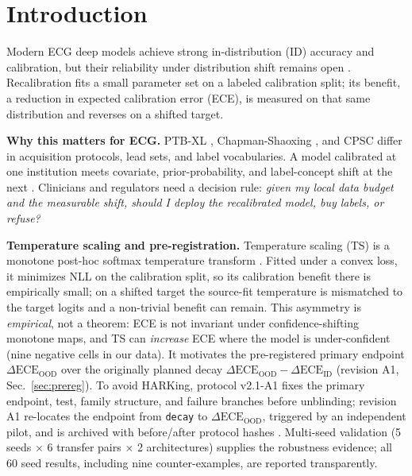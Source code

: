 \documentclass[review,12pt,nonatbib]{elsarticle}
\begin{document}


\section{Introduction}
\label{sec:intro}
Modern ECG deep models achieve strong in-distribution (ID) accuracy and
calibration, but their reliability under distribution shift remains open
\cite{ovadia2019calibration,guo2017calibration,wagner2020ptbxl}.
Recalibration fits a small parameter set on a labeled calibration split;
its benefit, a reduction in expected calibration error (ECE), is measured
on that same distribution and reverses on a shifted target.

\textbf{Why this matters for ECG.} PTB-XL \cite{wagner2020ptbxl},
Chapman-Shaoxing \cite{zheng2022ecgarrhythmia}, and CPSC differ in
acquisition protocols, lead sets, and label vocabularies. A model
calibrated at one institution meets covariate, prior-probability, and
label-concept shift at the next \cite{morenotorres2012}. Clinicians and
regulators need a decision rule: \emph{given my local data budget and the
measurable shift, should I deploy the recalibrated model, buy labels, or
refuse?}

\textbf{Temperature scaling and pre-registration.}
Temperature scaling (TS) is a monotone post-hoc softmax temperature
transform \cite{guo2017calibration}. Fitted under a convex loss, it
minimizes NLL on the calibration split, so its calibration benefit there
is empirically small; on a shifted target the source-fit temperature is
mismatched to the target logits and a non-trivial benefit can remain.
This asymmetry is \emph{empirical}, not a theorem: ECE is not invariant
under confidence-shifting monotone maps, and TS can \emph{increase} ECE
where the model is under-confident (nine negative cells in our data). It
motivates the pre-registered primary endpoint
$\Delta\text{ECE}_{\text{OOD}}$ over the originally planned decay
$\Delta\text{ECE}_{\text{OOD}}-\Delta\text{ECE}_{\text{ID}}$ (revision A1,
Sec.~\ref{sec:prereg}). To avoid HARKing, protocol v2.1-A1
\cite{protocolv21a1} fixes the primary endpoint, test, family structure,
and failure branches before unblinding; revision A1 re-locates the
endpoint from \texttt{decay} to $\Delta\text{ECE}_{\text{OOD}}$, triggered
by an independent pilot, and is archived with before/after protocol hashes
\cite{nosek2019prereg,lakens2019prereg}. Multi-seed validation
(5 seeds $\times$ 6 transfer pairs $\times$ 2 architectures) supplies the
robustness evidence; all 60 seed results, including nine counter-examples,
are reported transparently.
\end{document}
